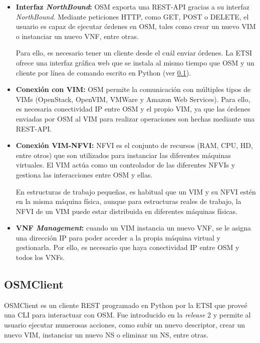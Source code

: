 \begin{itemize}
	\item \textbf{Interfaz \textit{NorthBound}:} \ac{OSM} exporta una REST-\ac{API} gracias a su interfaz \textit{NorthBound}. Mediante peticiones \ac{HTTP}, como GET, POST o DELETE, el usuario es capaz de ejecutar órdenes en \ac{OSM}, tales como crear un nuevo \ac{VIM} o instanciar un nuevo \ac{VNF}, entre otras.
	
	Para ello, es necesario tener un cliente desde el cuál enviar órdenes. La \ac{ETSI} ofrece una interfaz gráfica web que se instala al mismo tiempo que \ac{OSM} y un cliente por línea de comando escrito en Python (ver \ref{subsec:osmclientpython}).
	
	\item \textbf{Conexión con \ac{VIM}:} \ac{OSM} permite la comunicación con múltiples tipos de \acp{VIM} (OpenStack, OpenVIM, VMWare y Amazon Web Services). Para ello, es necesaria conectividad \ac{IP} entre \ac{OSM} y el propio \ac{VIM}, ya que las órdenes enviadas por \ac{OSM} al \ac{VIM} para realizar operaciones son hechas mediante una REST-\ac{API}.
	
	\item \textbf{Conexión \ac{VIM}-\ac{NFVI}:} \ac{NFVI} es el conjunto de recursos (RAM, CPU, HD, entre otros) que son utilizados para instanciar las diferentes máquinas virtuales. El \ac{VIM} actúa como un controlador de las diferentes \acp{NFVI} y gestiona las interacciones entre \ac{OSM} y ellas.
	
	En estructuras de trabajo pequeñas, es habitual que un \ac{VIM} y su \ac{NFVI} estén en la misma máquina física, aunque para estructuras reales de trabajo, la \ac{NFVI} de un \ac{VIM} puede estar distribuida en diferentes máquinas físicas.
	
	\item \textbf{\ac{VNF} \textit{Management}:} cuando un \ac{VIM} instancia un nuevo \ac{VNF}, se le asigna una dirección \ac{IP} para poder acceder a la propia máquina virtual y gestionarla. Por ello, es necesario que haya conectividad \ac{IP} entre \ac{OSM} y todos los \acp{VNF}. 
\end{itemize}

\subsection{OSMClient}
\label{subsec:osmclientpython}

OSMClient\cite{osmclientbib} es un cliente REST programado en Python por la \ac{ETSI} que proveé una \ac{CLI} para interactuar con \ac{OSM}. Fue introducido en la \textit{release} 2 y permite al usuario ejecutar numerosas acciones, como subir un nuevo descriptor, crear un nuevo \ac{VIM}, instanciar un nuevo \ac{NS} o eliminar un \ac{NS}, entre otras. 

